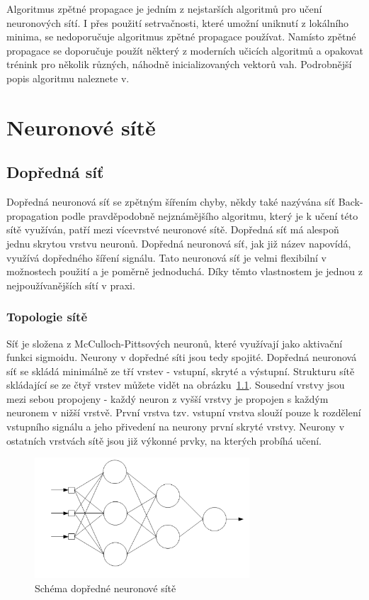 \documentclass[11pt,twoside,a4paper]{book}
\begin{document}
Algoritmus zpětné propagace je jedním z nejstarších algoritmů pro učení neuronových sítí. I přes použití setrvačnosti, které umožní uniknutí z lokálního minima, se nedoporučuje algoritmus zpětné propagace používat. Namísto zpětné propagace se doporučuje použít některý z moderních učicích algoritmů a opakovat trénink pro několik různých, náhodně inicializovaných vektorů vah.\cite{nndocumentation} Podrobnější popis algoritmu naleznete v\citep{skripta}.
\chapter{Neuronové sítě}
\section{Dopředná síť}
Dopředná neuronová síť se zpětným šířením chyby, někdy také nazývána síť Back-propagation podle pravděpodobně nejznámějšího algoritmu, který je k učení této sítě využíván, patří mezi vícevrstvé neuronové sítě. Dopředná síť má alespoň jednu skrytou vrstvu neuronů. Dopředná neuronová síť, jak již název napovídá, využívá dopředného šíření signálu. Tato neuronová síť je velmi flexibilní v možnostech použití a je poměrně jednoduchá. Díky těmto vlastnostem je jednou z nejpoužívanějších sítí v praxi.

\subsection{Topologie sítě}
Síť je složena z McCulloch-Pittsových neuronů, které využívají jako aktivační funkci sigmoidu. Neurony v dopředné síti jsou tedy spojité. Dopředná neuronová síť se skládá minimálně ze tří vrstev - vstupní, skryté a výstupní. Strukturu sítě skládající se ze čtyř vrstev můžete vidět na obrázku~\ref{fig:ffschema}. Sousední vrstvy jsou mezi sebou propojeny - každý neuron z vyšší vrstvy je propojen s každým neuronem v nižší vrstvě. První vrstva tzv. vstupní vrstva slouží pouze k rozdělení vstupního signálu a jeho přivedení na neurony první skryté vrstvy. Neurony v ostatních vrstvách sítě jsou již výkonné prvky, na kterých probíhá učení.
\begin{figure}[!h]
\begin{center}
\includegraphics[height=4.5cm]{figures/ffschema.png}
\caption{Schéma dopředné neuronové sítě}
\label{fig:ffschema}
\end{center}
\end{figure}
\end{document}
